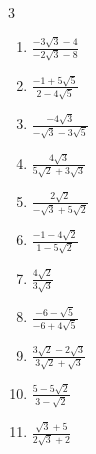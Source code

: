 \begin{multicols}{3}
\begin{enumerate}
  \item $\displaystyle \frac{-3\sqrt{3}-4}{-2\sqrt{3}-8}$


\columnbreak %

  \item $\displaystyle \frac{-1+5\sqrt{5}}{2-4\sqrt{5}}$


  \item $\displaystyle \frac{-4\sqrt{3}}{-\sqrt{3}-3\sqrt{5}}$


  \item $\displaystyle \frac{4\sqrt{3}}{5\sqrt{2}+3\sqrt{3}}$


  \item $\displaystyle \frac{2\sqrt{2}}{-\sqrt{3}+5\sqrt{2}}$


  \item $\displaystyle \frac{-1-4\sqrt{2}}{1-5\sqrt{2}}$


\columnbreak %

  \item $\displaystyle \frac{4\sqrt{2}}{3\sqrt{3}}$


  \item $\displaystyle \frac{-6-\sqrt{5}}{-6+4\sqrt{5}}$


  \item $\displaystyle \frac{3\sqrt{2}-2\sqrt{3}}{3\sqrt{2}+\sqrt{3}}$


  \item $\displaystyle \frac{5-5\sqrt{2}}{3-\sqrt{2}}$


  \item $\displaystyle \frac{\sqrt{3}+5}{2\sqrt{3}+2}$


\end{enumerate}
\end{multicols}
